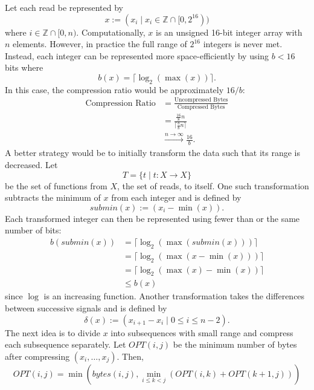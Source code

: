 Let each read be represented by
\[ x := (x_i\mid x_i \in \mathbb{Z} \cap [0, 2^{16})) \]
where $i\in \mathbb{Z}\cap [0, n)$. Computationally, $x$ is an unsigned 16-bit integer array with $n$ elements. However, in practice the full range of $2^{16}$ integers is never met. Instead, each integer can be represented more space-efficiently by using $b<16$ bits where \[b(x)=\lceil\log_2(\max(x))\rceil.\] In this case, the compression ratio would be approximately $16/b$:
\begin{align*}
	\text{Compression Ratio} &= \frac{\text{Uncompressed Bytes}}{\text{Compressed Bytes}}\\
	&=\frac{\frac{16}{8}n}{\lceil\frac{b}{8}n\rceil}\\
	&\stackrel{n\to\infty}{\longrightarrow}\frac{16}{b}.
\end{align*}
A better strategy would be to initially transform the data such that its range is decreased.
Let \[T=\{t\mid t:X\to X\}\] be the set of functions from $X$, the set of reads, to itself. One such transformation subtracts the minimum of $x$ from each integer and is defined by \[ submin(x) := (x_i-\min(x)). \] Each transformed integer can then be represented using fewer than or the same number of bits:
\begin{align*}
	b(submin(x))&=\lceil\log_2(\max(submin(x)))\rceil\\
	&=\lceil\log_2(\max(x-\min(x)))\rceil\\
	&=\lceil\log_2(\max(x)-\min(x))\rceil\\
	&\le b(x)
\end{align*}
since $\log$ is an increasing function.
Another transformation takes the differences between successive signals and is defined by
\[ \delta(x):=(x_{i+1}-x_i\mid 0\le i\le n-2).\]
The next idea is to divide $x$ into subsequences with small range and compress each subsequence separately. Let $OPT(i, j)$ be the minimum number of bytes after compressing $(x_i,\dots, x_j)$. Then,
\[ OPT(i, j) = \min(bytes(i, j),\min_{i\le k<j}(OPT(i, k) + OPT(k+1, j))) \]
